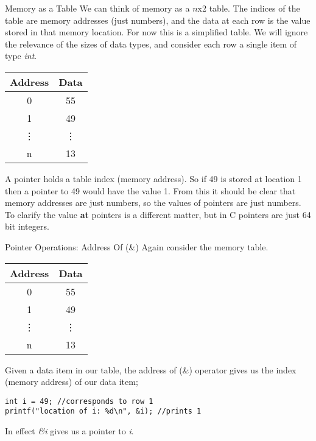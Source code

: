 \documentclass[10pt]{beamer}
\begin{document}
\iffalse
\begin{frame}{Memory as a Table}
	We can think of memory as a $n$x2 table. The indices of the table are memory addresses (just numbers), and the data at each row is the value stored in that memory location. For now this is a simplified table. We will ignore the relevance of the sizes of data types, and consider each row a single item of type {\it int}.

	\begin{tabular}{|c|c|}
		\hline
		Address & Data\\
		\hline
		0 & 55 \\
		\hline
		1 & 49 \\
		\hline
		\vdots & \vdots \\
		\hline
		n & 13\\
		\hline
	\end{tabular}

A pointer holds a table index (memory address). So if 49 is stored at location 1 then a pointer to 49 would have the value 1. From this it should be clear that memory addresses are just numbers, so the values of pointers are just numbers. To clarify the value {\bf at} pointers is a different matter, but in C pointers are just 64 bit integers.
\end{frame}

\begin{frame}[fragile]{Pointer Operations: Address Of (\&)}
	Again consider the memory table.

	\begin{tabular}{|c|c|}
		\hline
		Address & Data\\
		\hline
		0 & 55 \\
		\hline
		1 & 49 \\
		\hline
		\vdots & \vdots \\
		\hline
		n & 13\\
		\hline
	\end{tabular}

	Given a data item in our table, the address of (\&) operator gives us the index (memory address) of our data item;

\begin{verbatim}
int i = 49; //corresponds to row 1
printf("location of i: %d\n", &i); //prints 1
\end{verbatim}
In effect {\it \&i} gives us a pointer to {\it i}.

\end{frame}
\end{document}
